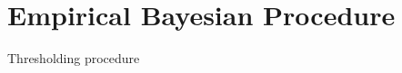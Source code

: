 \documentclass[10pt, aspectratio=169]{beamer}
\begin{document}
\section[Empirical approach]{Empirical Bayesian Procedure}

\begin{frame}{Thresholding procedure}
    

    
\end{frame}
\begin{frame}
    
\end{frame}
\begin{frame}
    
\end{frame}
\begin{frame}
    
\end{frame}
\begin{frame}
    
\end{frame}





\end{document}
